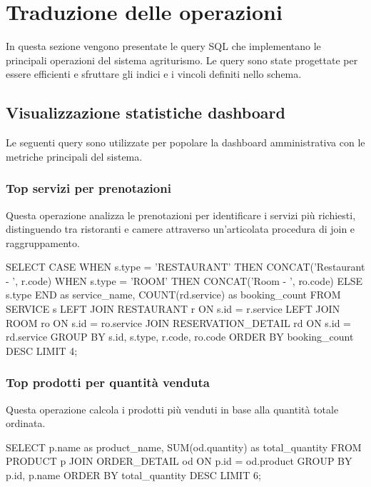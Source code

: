 \documentclass[a4paper,12pt]{report}
\begin{document}
\section{Traduzione delle operazioni} 
In questa sezione vengono presentate le query SQL che implementano le principali operazioni del sistema agriturismo. Le query sono state progettate per essere efficienti e sfruttare gli indici e i vincoli definiti nello schema. 

\subsection{Visualizzazione statistiche dashboard} 
Le seguenti query sono utilizzate per popolare la dashboard amministrativa con le metriche principali del sistema. 

\subsubsection{Top servizi per prenotazioni} 
Questa operazione analizza le prenotazioni per identificare i servizi più richiesti, distinguendo tra ristoranti e camere attraverso un'articolata procedura di join e raggruppamento.

\begin{sqlcode}[caption={Query per i servizi più prenotati}]
SELECT CASE WHEN s.type = 'RESTAURANT' THEN CONCAT('Restaurant - ', r.code) 
            WHEN s.type = 'ROOM' THEN CONCAT('Room - ', ro.code) 
            ELSE s.type END as service_name,
       COUNT(rd.service) as booking_count 
FROM SERVICE s 
LEFT JOIN RESTAURANT r ON s.id = r.service 
LEFT JOIN ROOM ro ON s.id = ro.service 
JOIN RESERVATION_DETAIL rd ON s.id = rd.service 
GROUP BY s.id, s.type, r.code, ro.code 
ORDER BY booking_count DESC 
LIMIT 4;
\end{sqlcode}

\subsubsection{Top prodotti per quantità venduta} 
Questa operazione calcola i prodotti più venduti in base alla quantità totale ordinata.

\begin{sqlcode}[caption={Query per i prodotti più venduti}]
SELECT p.name as product_name, SUM(od.quantity) as total_quantity 
FROM PRODUCT p 
JOIN ORDER_DETAIL od ON p.id = od.product 
GROUP BY p.id, p.name 
ORDER BY total_quantity DESC 
LIMIT 6;
\end{sqlcode}
\end{document}
